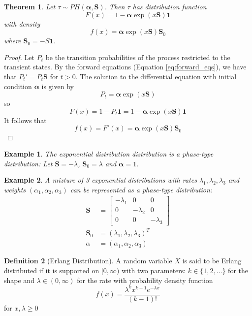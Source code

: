 \documentclass{article}
\theoremstyle{plain}
\newtheorem{theorem}{Theorem}[section]
\newtheorem{example}{Example}[theorem]
\theoremstyle{definition}
\newtheorem{defn}[theorem]{Definition}
\theoremstyle{remark}
\numberwithin{equation}{section}
\begin{document}
\begin{theorem} \label{thm:phase-type-pdf-cdf}
Let $\tau \sim PH(\boldsymbol{\alpha}, \mathbf{S})$.
Then $\tau$ has distribution function
$$
F(x) = 1 - \boldsymbol{\alpha} \exp(x \mathbf{S}) \mathbf{1}
$$
with density
$$
f(x) = \boldsymbol{\alpha} \exp(x \mathbf{S}) \mathbf{S}_0
$$
where
$\mathbf{S}_0 = - S \mathbf{1}$.
\end{theorem}

\begin{proof}
Let $P_t$ be the transition probabilities of the process restricted to the transient states.
By the forward equations (Equation \eqref{eq:forward_eqs}), we have that $P_t' = P_t \mathbf{S}$ for $t > 0$.
The solution to the differential equation with initial condition $\boldsymbol{\alpha}$ is given by
$$
P_t = \boldsymbol{\alpha} \exp(x \mathbf{S})
$$
so
$$
F(x) = 1 - P_t \mathbf{1} = 1 - \boldsymbol{\alpha} \exp(x \mathbf{S}) \mathbf{1}
$$
It follows that
$$
f(x) = F'(x) = \boldsymbol{\alpha} \exp(x \mathbf{S}) \mathbf{S}_0
$$
\end{proof}

\begin{example}
The exponential distribution distribution is a phase-type distribution:
Let $\mathbf S = - \lambda$, $\mathbf{S}_0 = \lambda$ and $\boldsymbol{\alpha} = 1$.
\end{example}

\begin{example}
A mixture of 3 exponential distributions with rates $\lambda_1, \lambda_2, \lambda_3$ and weights $(\alpha_1, \alpha_2, \alpha_3)$ can be represented as a phase-type distribution:
\begin{align*}
    \mathbf S &= \begin{bmatrix}
        -\lambda_1 & 0 & 0\\
        0 & - \lambda_2 & 0\\
        0 & 0 & - \lambda_3
        \end{bmatrix}\\
    \mathbf{S}_0 &= (\lambda_1, \lambda_2, \lambda_3)^T\\
    \alpha &= (\alpha_1, \alpha_2, \alpha_3)
\end{align*}
\end{example}

\begin{defn}[Erlang Distribution] \label{defn:erlang}
A random variable $X$ is said to be Erlang distributed if it is supported on $[0, \infty)$ with two parameters: $k \in \{1,2,\ldots\}$ for the shape and $\lambda \in (0,\infty)$ for the rate with probability density function
$$
f(x) = \frac{\lambda ^{k}x^{{k-1}}e^{{-\lambda x}}}{(k-1)!}
$$
for $x, \lambda \geq 0$
\end{defn}
\end{document}
